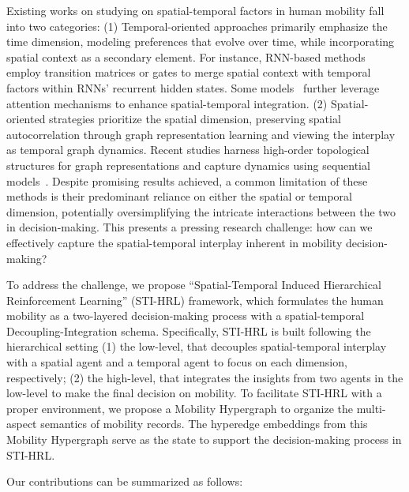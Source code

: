 \documentclass[letterpaper]{article} %
\begin{document}
%
Existing works on studying on spatial-temporal factors in human mobility fall into two categories: 
(1) Temporal-oriented approaches primarily emphasize the time dimension, modeling preferences that evolve over time, while incorporating spatial context as a secondary element. 
For instance, RNN-based methods~\cite{DBLP:conf/www/WangYCHWZH20,zhao2020go} employ transition matrices or gates to merge spatial context with temporal factors within RNNs' recurrent hidden states. 
Some models~\cite{lian2020geography,DBLP:conf/www/LuoLL21} further leverage attention mechanisms to enhance spatial-temporal integration. 
(2) Spatial-oriented strategies prioritize the spatial dimension, preserving spatial autocorrelation through graph representation learning and viewing the interplay as temporal graph dynamics. 
Recent studies harness high-order topological structures for graph representations and capture dynamics using sequential models~\cite{wang2019adversarial,yang2019revisiting,wang2020exploiting,wang2022learning,wang2023reinforced}. 
Despite promising results achieved, a common limitation of these methods is their predominant reliance on either the spatial or temporal dimension, potentially oversimplifying the intricate interactions between the two in decision-making.
This presents a pressing research challenge: how can we effectively capture the spatial-temporal interplay inherent in mobility decision-making?


To address the challenge, we propose ``Spatial-Temporal Induced Hierarchical Reinforcement Learning'' (STI-HRL) framework, which formulates the human mobility as a two-layered decision-making process with a spatial-temporal Decoupling-Integration schema. 
Specifically, STI-HRL is built following the hierarchical setting
(1) the low-level, that decouples spatial-temporal interplay with a spatial agent and a temporal agent to focus on each dimension, respectively; 
(2) the high-level, that integrates the insights from two agents in the low-level to make the final decision on mobility. 
To facilitate STI-HRL with a proper environment, we propose a Mobility Hypergraph to organize the multi-aspect semantics of mobility records. 
The hyperedge embeddings from this Mobility Hypergraph serve as the state to support the decision-making process in STI-HRL.

Our contributions can be summarized as follows:
\end{document}
